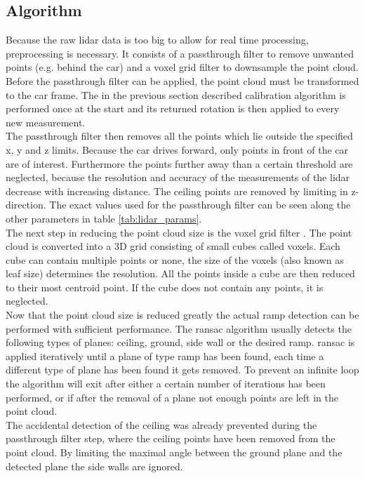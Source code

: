 \subsection{Algorithm}
Because the raw \gls{lidar} data is too big to allow for real time processing, preprocessing is necessary.
It consists of a passthrough filter to remove unwanted points (e.g. behind the car) and a voxel grid filter to downsample the point cloud.
Before the passthrough filter can be applied, the point cloud must be transformed to the car frame.
The in the previous section described calibration algorithm is performed once at the start and its returned rotation is then applied to every new measurement.\\
The passthrough filter then removes all the points which lie outside the specified x, y and z limits.
Because the car drives forward, only points in front of the car are of interest.
Furthermore the points further away than a certain threshold are neglected, because the resolution and accuracy of the measurements of the \gls{lidar} decrease with increasing distance.
The ceiling points are removed by limiting in z-direction.
The exact values used for the passthrough filter can be seen along the other parameters in table \ref{tab:lidar_params}.\\
The next step in reducing the point cloud size is the voxel grid filter \cite{Vosselman2004}.
The point cloud is converted into a 3D grid consisting of small cubes called voxels.
Each cube can contain multiple points or none, the size of the voxels (also known as leaf size) determines the resolution.
All the points inside a cube are then reduced to their most centroid point.
If the cube does not contain any points, it is neglected.\\
Now that the point cloud size is reduced greatly the actual ramp detection can be performed with sufficient performance.
The \gls{ransac} algorithm usually detects the following types of planes: ceiling, ground, side wall or the desired ramp.
\gls{ransac} is applied iteratively until a plane of type ramp has been found, each time a different type of plane has been found it gets removed.
To prevent an infinite loop the algorithm will exit after either a certain number of iterations has been performed, or if after the removal of a plane not enough points are left in the point cloud.\\
The accidental detection of the ceiling was already prevented during the passthrough filter step, where the ceiling points have been removed from the point cloud.
By limiting the maximal angle between the ground plane and the detected plane the side walls are ignored.
